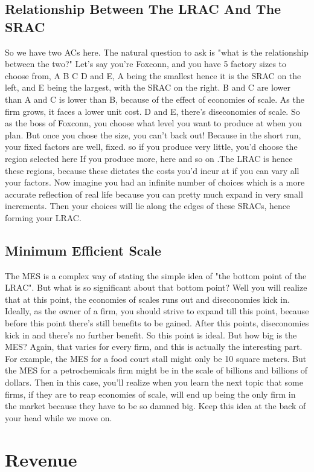\subsection{Relationship Between The LRAC And The SRAC}
So we have two ACs here. The natural question to ask is "what is the relationship between the two?" Let's say you're Foxconn, and you have 5 factory sizes to choose from, A B C D and E, A being the smallest hence it is the SRAC on the left, and E being the largest, with the SRAC on the right. B and C are lower than A and C is lower than B, because of the effect of economies of scale. As the firm grows, it faces a lower unit cost. D and E, there's diseconomies of scale. So as the boss of Foxconn, you choose what level you want to produce at when you plan. But once you chose the size, you can't back out! Because in the short run, your fixed factors are well, fixed. so if you produce very little, you'd choose the region selected here If you produce more, here and so on .The LRAC is hence these regions, because these dictates the costs you'd incur at if you can vary all your factors. Now imagine you had an infinite number of choices which is a more accurate reflection of real life because you can pretty much expand in very small increments. Then your choices will lie along the edges of these SRACs, hence forming your LRAC. 
\subsection{Minimum Efficient Scale}
The MES is a complex way of stating the simple idea of "the bottom point of the LRAC". But what is so significant about that bottom point? Well you will realize that at this point, the economies of scales runs out and diseconomies kick in. Ideally, as the owner of a firm, you should strive to expand till this point, because before this point there's still benefits to be gained. After this points, diseconomies kick in and there's no further benefit. So this point is ideal. But how big is the MES? Again, that varies for every firm, and this is actually the interesting part. For example, the MES for a food court stall might only be 10 square meters. But the MES for a petrochemicals firm might be in the scale of billions and billions of dollars. Then in this case, you'll realize when you learn the next topic that some firms, if they are to reap economies of scale, will end up being the only firm in the market because they have to be so damned big. Keep this idea at the back of your head while we move on.
\section{Revenue}
